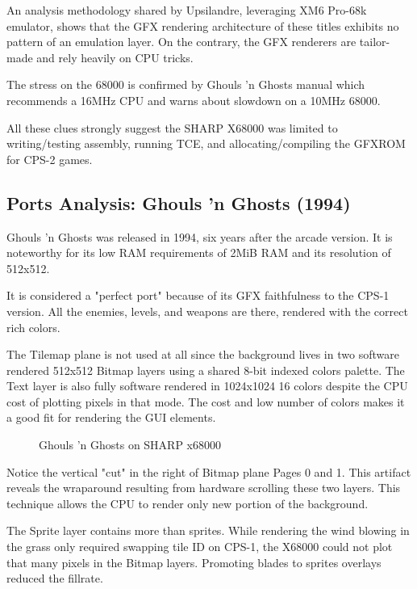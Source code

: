An analysis methodology shared by Upsilandre\cite{x68k_games_analysis}, leveraging XM6 Pro-68k emulator, shows that the GFX rendering architecture of these titles exhibits no pattern of an emulation layer. On the contrary, the GFX renderers are tailor-made and rely heavily on CPU tricks. 

\begin{trivia}
The stress on the 68000 is confirmed by Ghouls 'n Ghosts manual which recommends a 16MHz CPU and warns about slowdown on a 10MHz 68000.
\end{trivia}

All these clues strongly suggest the SHARP X68000 was limited to writing/testing assembly, running TCE, and allocating/compiling the GFXROM for CPS-2 games.



\subsection{Ports Analysis: Ghouls 'n Ghosts (1994)}
Ghouls 'n Ghosts was released in 1994, six years after the arcade version. It is noteworthy for its low RAM requirements of 2MiB RAM and its resolution of 512x512.

It is considered a "perfect port" because of its GFX faithfulness to the CPS-1 version. All the enemies, levels, and weapons are there, rendered with the correct rich colors. 

The Tilemap plane is not used at all since the background lives in two software rendered 512x512 Bitmap layers using a shared 8-bit indexed colors palette. The Text layer is also fully software rendered in 1024x1024 16 colors despite the CPU cost of plotting pixels in that mode. The cost and low number of colors makes it a good fit for rendering the GUI elements.

\begin{figure}[H]
\caption*{Ghouls 'n Ghosts on SHARP x68000}
\end{figure}


Notice the vertical "cut" in the right of Bitmap plane Pages 0 and 1. This artifact reveals the wraparound resulting from hardware scrolling these two layers. This technique allows the CPU to render only new portion of the background. 

The Sprite layer contains more than sprites. While rendering the wind blowing in the grass only required swapping tile ID on CPS-1, the X68000 could not plot that many pixels in the Bitmap layers. Promoting blades to sprites overlays reduced the fillrate.

